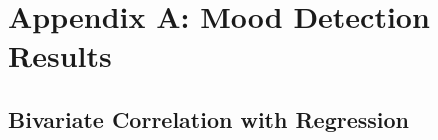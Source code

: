 
\chapter{Appendix A: Mood Detection Results} %

\label{AppendixA} %


\section{Bivariate Correlation with Regression}
\label{sec:bivariatediagram}

